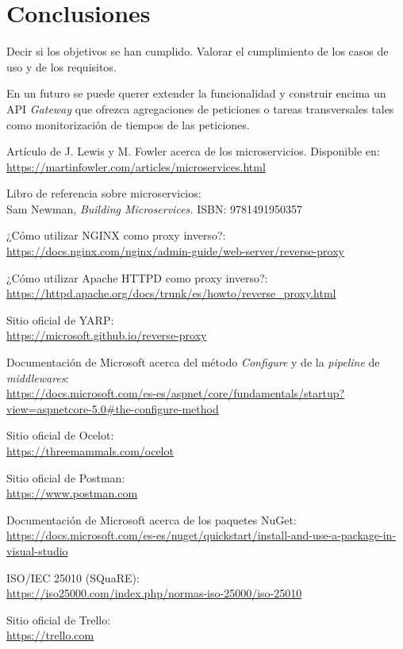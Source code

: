 \documentclass[11pt,spanish,listoffigures]{tfgetsinf}
\begin{document}
\chapter{Conclusiones}

Decir si los objetivos se han cumplido. Valorar el cumplimiento de los casos de uso y de los requisitos.

En un futuro se puede querer extender la funcionalidad y construir encima un API \emph{Gateway} que ofrezca agregaciones de peticiones o tareas transversales tales como monitorización de tiempos de las peticiones.


\begin{thebibliography}{10}

Artículo de J. Lewis y M. Fowler acerca de los microservicios.
\newblock Disponible en:\\
\url{https://martinfowler.com/articles/microservices.html}

Libro de referencia sobre microservicios:\\
\newblock Sam Newman,
\newblock \emph{Building Microservices.}
\newblock ISBN: 9781491950357

¿Cómo utilizar NGINX como proxy inverso?:\\
\url{https://docs.nginx.com/nginx/admin-guide/web-server/reverse-proxy}

¿Cómo utilizar Apache HTTPD como proxy inverso?:\\
\url{https://httpd.apache.org/docs/trunk/es/howto/reverse_proxy.html}

Sitio oficial de YARP:\\
\url{https://microsoft.github.io/reverse-proxy}

Documentación de Microsoft acerca del método \emph{Configure} y de la \emph{pipeline} de \emph{middlewares}:\\
\url{https://docs.microsoft.com/es-es/aspnet/core/fundamentals/startup?view=aspnetcore-5.0#the-configure-method}

Sitio oficial de Ocelot:\\
\url{https://threemammals.com/ocelot}

Sitio oficial de Postman:\\
\url{https://www.postman.com}

Documentación de Microsoft acerca de los paquetes NuGet:\\
\url{https://docs.microsoft.com/es-es/nuget/quickstart/install-and-use-a-package-in-visual-studio}

ISO/IEC 25010 (SQuaRE):\\
\url{https://iso25000.com/index.php/normas-iso-25000/iso-25010}

Sitio oficial de Trello:\\
\url{https://trello.com}

\end{thebibliography}
\end{document}
